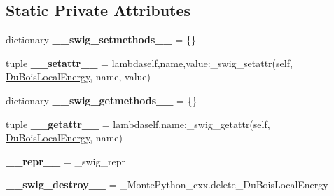 \subsection*{Static Private Attributes}
\begin{DoxyCompactItemize}
\item 
\hypertarget{classMontePython__cxx_1_1DuBoisLocalEnergy_a026a8fdf942868dcc8c293dde56a7164}{}dictionary {\bfseries \+\_\+\+\_\+swig\+\_\+setmethods\+\_\+\+\_\+} = \{\}\label{classMontePython__cxx_1_1DuBoisLocalEnergy_a026a8fdf942868dcc8c293dde56a7164}

\item 
\hypertarget{classMontePython__cxx_1_1DuBoisLocalEnergy_aeb0e14f4c19454d0f9bcb58cb896d1c3}{}tuple {\bfseries \+\_\+\+\_\+setattr\+\_\+\+\_\+} = lambdaself,name,value\+:\+\_\+swig\+\_\+setattr(self, \hyperlink{classMontePython__cxx_1_1DuBoisLocalEnergy}{Du\+Bois\+Local\+Energy}, name, value)\label{classMontePython__cxx_1_1DuBoisLocalEnergy_aeb0e14f4c19454d0f9bcb58cb896d1c3}

\item 
\hypertarget{classMontePython__cxx_1_1DuBoisLocalEnergy_afecdf3a26668b8d0c96dfd7be2b3ebd5}{}dictionary {\bfseries \+\_\+\+\_\+swig\+\_\+getmethods\+\_\+\+\_\+} = \{\}\label{classMontePython__cxx_1_1DuBoisLocalEnergy_afecdf3a26668b8d0c96dfd7be2b3ebd5}

\item 
\hypertarget{classMontePython__cxx_1_1DuBoisLocalEnergy_ae83b82022753402dd25316798d745a77}{}tuple {\bfseries \+\_\+\+\_\+getattr\+\_\+\+\_\+} = lambdaself,name\+:\+\_\+swig\+\_\+getattr(self, \hyperlink{classMontePython__cxx_1_1DuBoisLocalEnergy}{Du\+Bois\+Local\+Energy}, name)\label{classMontePython__cxx_1_1DuBoisLocalEnergy_ae83b82022753402dd25316798d745a77}

\item 
\hypertarget{classMontePython__cxx_1_1DuBoisLocalEnergy_a7b302c1c515dd8a2ec0c85a034e2a7f5}{}{\bfseries \+\_\+\+\_\+repr\+\_\+\+\_\+} = \+\_\+swig\+\_\+repr\label{classMontePython__cxx_1_1DuBoisLocalEnergy_a7b302c1c515dd8a2ec0c85a034e2a7f5}

\item 
\hypertarget{classMontePython__cxx_1_1DuBoisLocalEnergy_ac5a0168d2572114752a9fc5bbdcd2e38}{}{\bfseries \+\_\+\+\_\+swig\+\_\+destroy\+\_\+\+\_\+} = \+\_\+\+Monte\+Python\+\_\+cxx.\+delete\+\_\+\+Du\+Bois\+Local\+Energy\label{classMontePython__cxx_1_1DuBoisLocalEnergy_ac5a0168d2572114752a9fc5bbdcd2e38}

\end{DoxyCompactItemize}


